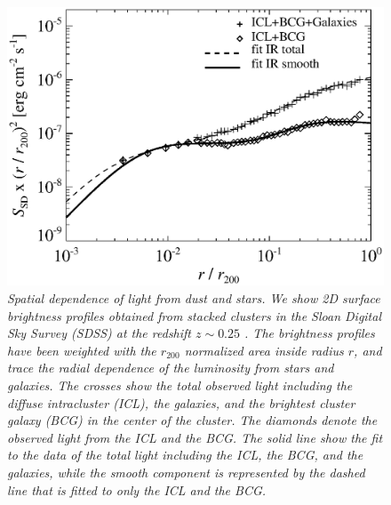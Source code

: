 \documentclass[10pt,aps,pra,reprint,amsmath,amsfonts,amssymb,showpacs]{revtex4-1}
\newcommand{\rvir}{r_{200}}
\begin{document}


\begin{figure}%
 \includegraphics[width=0.99\columnwidth]{figures/SB.photon.eps}
\caption{\it Spatial dependence of light from dust and stars. We show
  2D surface brightness profiles obtained from stacked clusters in the
  Sloan Digital Sky Survey (SDSS) at the redshift $z \sim 0.25$
  \cite{2005MNRAS.358..949Z}. The brightness profiles have been
  weighted with the $\rvir$ normalized area inside radius $r$, and
  trace the radial dependence of the luminosity from stars and
  galaxies. The crosses show the total observed light including the
  diffuse intracluster (ICL), the galaxies, and the brightest cluster
  galaxy (BCG) in the center of the cluster. The diamonds denote the
  observed light from the ICL and the BCG. The solid line show the fit
  to the data of the total light including the ICL, the BCG, and the
  galaxies, while the smooth component is represented by the dashed
  line that is fitted to only the ICL and the BCG.}
 \label{fig3}
\end{figure}
\end{document}
